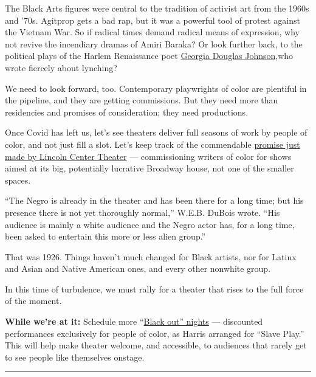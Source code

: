 The Black Arts figures were central to the tradition of activist art
from the 1960s and '70s. Agitprop gets a bad rap, but it was a powerful
tool of protest against the Vietnam War. So if radical times demand
radical means of expression, why not revive the incendiary dramas of
Amiri Baraka? Or look further back, to the political plays of the Harlem
Renaissance poet
\href{https://www.georgiaencyclopedia.org/articles/arts-culture/georgia-douglas-johnson-ca-1877-1966}{Georgia
Douglas Johnson,}who wrote fiercely about lynching?

We need to look forward, too. Contemporary playwrights of color are
plentiful in the pipeline, and they are getting commissions. But they
need more than residencies and promises of consideration; they need
productions.

Once Covid has left us, let's see theaters deliver full seasons of work
by people of color, and not just fill a slot. Let's keep track of the
commendable
\href{https://www.lct.org/explore/blog/lct-announces-beaumont-new-play-commission-program/}{promise
just made by Lincoln Center Theater} --- commissioning writers of color
for shows aimed at its big, potentially lucrative Broadway house, not
one of the smaller spaces.

``The Negro is already in the theater and has been there for a long
time; but his presence there is not yet thoroughly normal,'' W.E.B.
DuBois wrote. ``His audience is mainly a white audience and the Negro
actor has, for a long time, been asked to entertain this more or less
alien group.''

That was 1926. Things haven't much changed for Black artists, nor for
Latinx and Asian and Native American ones, and every other nonwhite
group.

In this time of turbulence, we must rally for a theater that rises to
the full force of the moment.

\textbf{While we're at it:} Schedule more
``\href{https://www.nytimes3xbfgragh.onion/2019/12/03/style/self-care/at-black-out-performances-the-power-of-healing-through-community.html}{Black
out'' nights} --- discounted performances exclusively for people of
color, as Harris arranged for ``Slave Play.'' This will help make
theater welcome, and accessible, to audiences that rarely get to see
people like themselves onstage.

\begin{center}\rule{0.5\linewidth}{\linethickness}\end{center}

